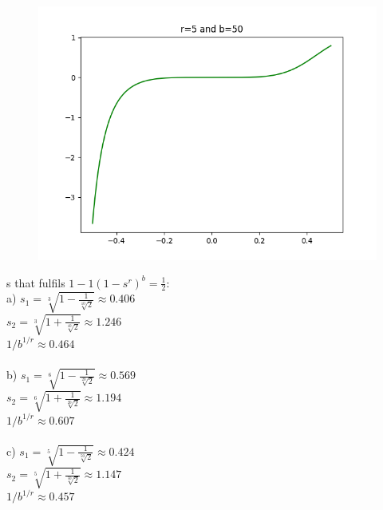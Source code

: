 \documentclass[]{scrartcl}
\begin{document}
\begin{figure}[h!]
	\centering
	\includegraphics[width=0.5\linewidth]{Exercise4_plots/plot_3}
\end{figure}

\vspace{5cm}
s that fulfils $1-1(1-s^r)^b = \frac{1}{2}$:\\

a) $ s_1 = \sqrt[3]{1-\frac{1}{\sqrt[10]{2}}} \approx 0.406 $\\
$ s_2 = \sqrt[3]{1+\frac{1}{\sqrt[10]{2}}} \approx 1.246 $\\
$1/b^{1/r} \approx 0.464$\\\\

b) $ s_1 = \sqrt[6]{1-\frac{1}{\sqrt[20]{2}}} \approx 0.569 $\\
$ s_2 = \sqrt[6]{1+\frac{1}{\sqrt[20]{2}}} \approx 1.194 $\\
$1/b^{1/r}\approx 0.607$\\\\

c) $ s_1 = \sqrt[5]{1-\frac{1}{\sqrt[50]{2}}} \approx 0.424 $\\
$ s_2 = \sqrt[5]{1+\frac{1}{\sqrt[50]{2}}} \approx 1.147 $\\
$1/b^{1/r} \approx 0.457$\\\\
\end{document}

